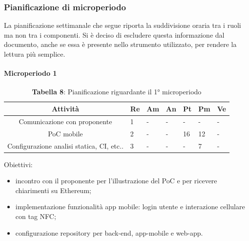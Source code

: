 \subsubsection{Pianificazione di microperiodo}
\indent La pianificazione settimanale che segue riporta la suddivisione oraria tra i ruoli ma non tra i componenti. Si è deciso di escludere questa informazione dal documento, anche se essa è presente nello strumento utilizzato, per rendere la lettura più semplice.

\paragraph{Microperiodo 1}
\begin{table}[H]
	\centering
	\renewcommand{\arraystretch}{1.5}
	\begin{tabular}{|c|p{10mm}|p{10mm}|p{10mm}|p{10mm}|p{10mm}|p{10mm}|}
		\hline
		\rowcolor{lighter-grayer}
		\textbf{Attività}                         & \textbf{Re} & \textbf{Am} & \textbf{An} & \textbf{Pt} & \textbf{Pm} & \textbf{Ve} \\ \hline
		Comunicazione con proponente              & 1           & -           & -           & -           & -           & -           \\ \hline
		PoC mobile                                & 2           & -           & -           & 16          & 12          & -           \\ \hline
		Configurazione analisi statica, CI, etc.. & 3           & -           & -           & -           & 7           & -           \\ \hline 
	\end{tabular}
	\caption*{\textbf{Tabella 8}: Pianificazione riguardante il 1° microperiodo\\}
\end{table}

Obiettivi:
\begin{itemize}
	\item incontro con il proponente per l'illustrazione del PoC e per ricevere chiarimenti su Ethereum;
	\item implementazione funzionalità app mobile: login utente e interazione cellulare con tag NFC;
	\item configurazione repository per back-end, app-mobile e web-app.
\end{itemize}

